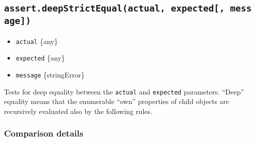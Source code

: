 \subsection{\texorpdfstring{\texttt{assert.deepStrictEqual(actual,\ expected{[},\ message{]})}}{assert.deepStrictEqual(actual, expected{[}, message{]})}}\label{assert.deepstrictequalactual-expected-message}

\begin{itemize}
\tightlist
\item
  \texttt{actual} \{any\}
\item
  \texttt{expected} \{any\}
\item
  \texttt{message} \{string\textbar Error\}
\end{itemize}

Tests for deep equality between the \texttt{actual} and
\texttt{expected} parameters. ``Deep'' equality means that the
enumerable ``own'' properties of child objects are recursively evaluated
also by the following rules.

\subsubsection{Comparison details}\label{comparison-details-1}

